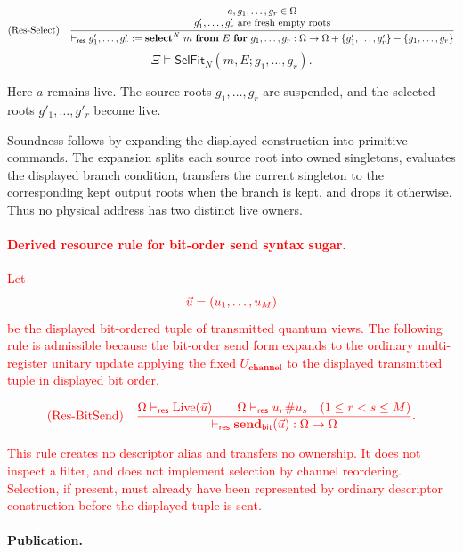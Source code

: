 \documentclass[acmsmall,screen,review,anonymous,nonacm]{acmart}
\theoremstyle{defn_style}
\begin{document}
\[
\text{\rm (Res-Select)}
\quad
\frac{
\begin{array}{c}
a,g_1,\ldots,g_r\in \Omega\\
g'_1,\ldots,g'_r\text{ are fresh empty roots}\\
\end{array}
}{
\vdash_{\mathsf{res}}
g'_1,\ldots,g'_r
:=
\mathbf{select}^{N}\ m\ \mathbf{from}\ E\ \mathbf{for}\ g_1,\ldots,g_r
:\Omega\rightarrow
\Omega+\{g'_1,\ldots,g'_r\}-\{g_1,\ldots,g_r\}
}
\]
\[
\Xi\vDash
\mathsf{SelFit}_N(m,E;g_1,\ldots,g_r).
\]

Here \(a\) remains live. The source roots \(g_1,\ldots,g_r\) are suspended, and
the selected roots \(g'_1,\ldots,g'_r\) become live.

Soundness follows by expanding the displayed construction into primitive
commands. The expansion splits each source root into owned singletons, evaluates
the displayed branch condition, transfers the current singleton to the
corresponding kept output roots when the branch is kept, and drops it otherwise.
Thus no physical address has two distinct live owners.

\paragraph{\textcolor{red}{Derived resource rule for bit-order send syntax sugar.}}

\textcolor{red}{Let}
\[\textcolor{red}{\vec u=(u_1,\ldots,u_M)}\]
\textcolor{red}{be the displayed bit-ordered tuple of transmitted quantum views.  The following rule is admissible because the bit-order send form expands to the ordinary multi-register unitary update applying the fixed \(U_{\textbf{channel}}\) to the displayed transmitted tuple in displayed bit order.}

\[\textcolor{red}{\text{\rm (Res-BitSend)}\quad\frac{\Omega\vdash_{\mathsf{res}}\operatorname{Live}(\vec u)\qquad\Omega\vdash_{\mathsf{res}}u_r\#u_s\quad(1\le r<s\le M)}{\vdash_{\mathsf{res}}\mathbf{send}_{\mathsf{bit}}(\vec u):\Omega\rightarrow\Omega}.}\]

\textcolor{red}{This rule creates no descriptor alias and transfers no ownership.  It does not inspect a filter, and does not implement selection by channel reordering.  Selection, if present, must already have been represented by ordinary descriptor construction before the displayed tuple is sent.}


\paragraph{Publication.}
\end{document}
